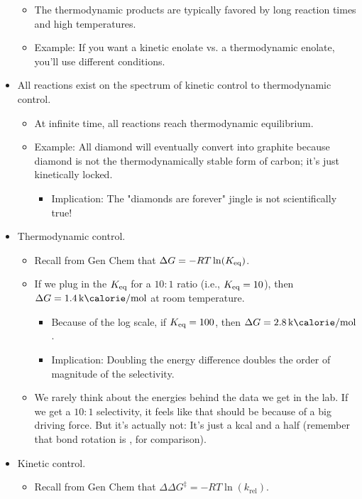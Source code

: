 \documentclass[../notes.tex]{subfiles}
\begin{document}
\begin{itemize}
\begin{itemize}
        \item The thermodynamic products are typically favored by long reaction times and high temperatures.
        \item Example: If you want a kinetic enolate vs. a thermodynamic enolate, you'll use different conditions.
    \end{itemize}
    \item All reactions exist on the spectrum of kinetic control to thermodynamic control.
    \begin{itemize}
        \item At infinite time, all reactions reach thermodynamic equilibrium.
        \item Example: All diamond will eventually convert into graphite because diamond is not the thermodynamically stable form of carbon; it's just kinetically locked.
        \begin{itemize}
            \item Implication: The "diamonds are forever" jingle is not scientifically true!
        \end{itemize}
    \end{itemize}
    \item Thermodynamic control.
    \begin{itemize}
        \item Recall from Gen Chem that $\Delta G=-RT\ln(K_\textup{eq})$.
        \item If we plug in the $K_\textup{eq}$ for a $10:1$ ratio (i.e., $K_\textup{eq}=10$), then $\Delta G=\kcal{1.4}$ at room temperature.
        \begin{itemize}
            \item Because of the log scale, if $K_\textup{eq}=100$, then $\Delta G=\kcal{2.8}$.
            \item Implication: Doubling the energy difference doubles the order of magnitude of the selectivity.
        \end{itemize}
        \item We rarely think about the energies behind the data we get in the lab. If we get a $10:1$ selectivity, it feels like that should be because of a big driving force. But it's actually not: It's just a kcal and a half (remember that bond rotation is , for comparison).
    \end{itemize}
    \item Kinetic control.
    \begin{itemize}
        \item Recall from Gen Chem that $\Delta\Delta G^\ddagger=-RT\ln(k_\text{rel})$.

\end{itemize}
\end{itemize}
\end{document}
